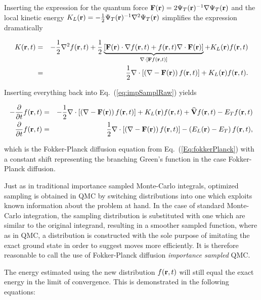 Inserting the expression for the quantum force $\mathbf{F}(\mathbf{r}) = 2\Psi_T(\mathbf{r})^{-1}\nabla\Psi_T(\mathbf{r})$ and the local kinetic energy $K_L(\mathbf{r}) = -\frac{1}{2}\Psi_T(\mathbf{r})^{-1}\nabla^2\Psi_T(\mathbf{r})$ simplifies the expression dramatically

\begin{eqnarray*}
 K(\mathbf{r}, t) &=& - \frac{1}{2}\nabla^2 f(\mathbf{r}, t) + \frac{1}{2}\underbrace{\left[\mathbf{F}(\mathbf{r})\cdot \nabla f(\mathbf{r}, t) + f(\mathbf{r}, t)\nabla\cdot \mathbf{F}(\mathbf{r})\right]}_{\nabla\cdot\left[\mathbf{F} f(\mathbf{r}, t)\right]} + K_L(\mathbf{r})f(\mathbf{r}, t)\\
         &=& \frac{1}{2}\nabla\cdot \left[\left(\nabla - \mathbf{F}(\mathbf{r})\right)f(\mathbf{r}, t)\right] + K_L(\mathbf{r})f(\mathbf{r}, t).
\end{eqnarray*}

Inserting everything back into Eq.~(\ref{eq:impSamplRaw}) yields

\begin{eqnarray}
 -\frac{\partial}{\partial t}f(\mathbf{r}, t) &=& -\frac{1}{2}\nabla\cdot \left[\left(\nabla - \mathbf{F}(\mathbf{r})\right)f(\mathbf{r}, t)\right] + K_L(\mathbf{r})f(\mathbf{r}, t) + {\bf\widehat{V}}f(\mathbf{r}, t) - E_Tf(\mathbf{r},t) \nonumber\\
  \frac{\partial}{\partial t}f(\mathbf{r}, t)  &=& \frac{1}{2}\nabla\cdot \left[\left(\nabla - \mathbf{F}(\mathbf{r})\right)f(\mathbf{r}, t)\right] - \left(E_L(\mathbf{r}) - E_T\right)f(\mathbf{r}, t), 
\end{eqnarray}

which is the Fokker-Planck diffusion equation from Eq.~(\ref{Eq:fokkerPlanck}) with a constant shift representing the branching Green's function in the case Fokker-Planck diffusion.

Just as in traditional importance sampled Monte-Carlo integrals, optimized sampling is obtained in QMC by switching distributions into one which exploits known information about the problem at hand. In the case of standard Monte-Carlo integration, the sampling distribution is substituted with one which are similar to the original integrand, resulting in a smoother sampled function, where as in QMC, a distribution is constructed with the sole purpose of imitating the exact ground state in order to suggest moves more efficiently. It is therefore reasonable to call the use of Fokker-Planck diffusion \textit{importance sampled} QMC.

The energy estimated using the new distribution $f(\mathbf{r}, t)$ will still equal the exact energy in the limit of convergence. This is demonstrated in the following equations:

